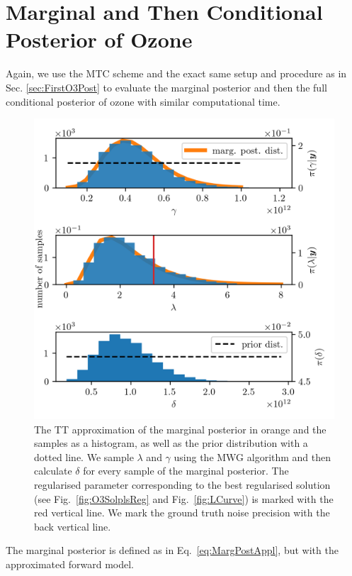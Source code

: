 \section{Marginal and Then Conditional Posterior of Ozone}

Again, we use the MTC scheme and the exact same setup and procedure as in Sec. \ref{sec:FirstO3Post} to evaluate the marginal posterior and then the full conditional posterior of ozone with similar computational time.

\begin{figure}[ht!]
	\centering
	\includegraphics{secMargO3Res.png}
	\caption[Marginal posterior histograms and TT approximation as well as hyper-prior distribution.]{The TT approximation of the marginal posterior in orange and the samples as a histogram, as well as the prior distribution with a dotted line. We sample $\lambda$ and $\gamma$ using the MWG algorithm and then calculate $\delta$ for every sample of the marginal posterior. The regularised parameter corresponding to the best regularised solution (see Fig.~\ref{fig:O3SolplsReg} and Fig.~\ref{fig:LCurve}) is marked with the red vertical line. We mark the ground truth noise precision with the back vertical line.}
	\label{fig:MargPostHistTT}
\end{figure}
The marginal posterior is defined as in Eq.~\ref{eq:MargPostAppl}, but with the approximated forward model.
